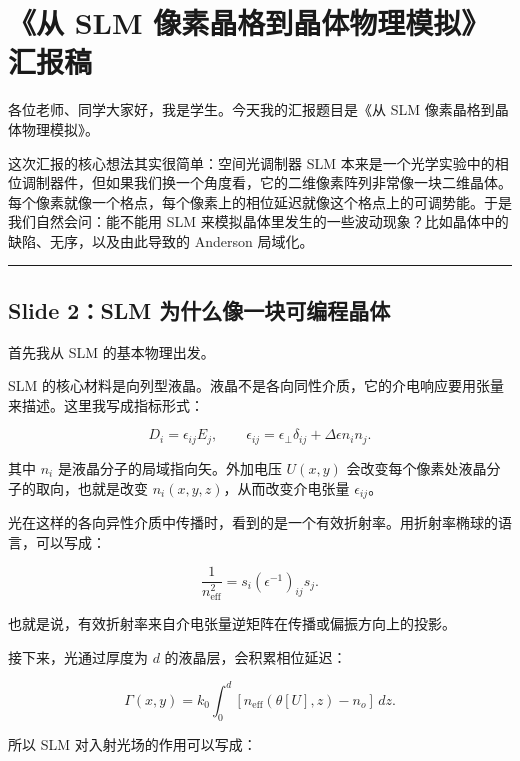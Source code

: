 \documentclass[UTF8,fontset=none,12pt]{ctexart}
\begin{document}
\pagestyle{plain}
\section*{《从 SLM 像素晶格到晶体物理模拟》汇报稿}

各位老师、同学大家好，我是学生。今天我的汇报题目是《从 SLM 像素晶格到晶体物理模拟》。\par

这次汇报的核心想法其实很简单：空间光调制器 SLM 本来是一个光学实验中的相位调制器件，但如果我们换一个角度看，它的二维像素阵列非常像一块二维晶体。每个像素就像一个格点，每个像素上的相位延迟就像这个格点上的可调势能。于是我们自然会问：能不能用 SLM 来模拟晶体里发生的一些波动现象？比如晶体中的缺陷、无序，以及由此导致的 Anderson 局域化。\par

\bigskip\hrule\bigskip

\subsection*{Slide 2：SLM 为什么像一块可编程晶体}

首先我从 SLM 的基本物理出发。\par

SLM 的核心材料是向列型液晶。液晶不是各向同性介质，它的介电响应要用张量来描述。这里我写成指标形式：\par

\[
D_i=\epsilon_{ij}E_j,
\qquad
\epsilon_{ij}=\epsilon_\perp\delta_{ij}+\Delta\epsilon n_i n_j .
\]

其中 $n_i$ 是液晶分子的局域指向矢。外加电压 $U(x,y)$ 会改变每个像素处液晶分子的取向，也就是改变 $n_i(x,y,z)$，从而改变介电张量 $\epsilon_{ij}$。\par

光在这样的各向异性介质中传播时，看到的是一个有效折射率。用折射率椭球的语言，可以写成：\par

\[
\frac{1}{n_{\mathrm{eff}}^2}
=s_i(\epsilon^{-1})_{ij}s_j .
\]

也就是说，有效折射率来自介电张量逆矩阵在传播或偏振方向上的投影。\par

接下来，光通过厚度为 $d$ 的液晶层，会积累相位延迟：\par

\[
\Gamma(x,y)=k_0\int_0^d[n_{\mathrm{eff}}(\theta[U],z)-n_o]\,dz .
\]

所以 SLM 对入射光场的作用可以写成：\par
\end{document}

